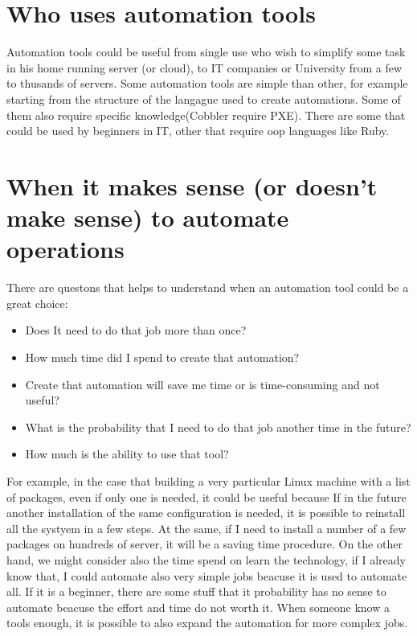 \documentclass[12pt,a4paper,openright,twoside]{book}
\begin{document}
\section{Who uses automation tools}
Automation tools could be useful from single use who wish to simplify some task in his home running server (or cloud), to IT companies or University from a few to thusands of servers.
Some automation tools are simple than other, for example starting from the structure of the langague used to create automations.
Some of them also require specific knowledge(Cobbler require PXE).
There are some that could be used by beginners in IT, other that require oop languages like Ruby.

\section{When it makes sense (or doesn't make sense) to automate operations}
There are questons that helps to understand when an automation tool could be a great choice:
\begin{itemize}
    \item Does It need to do that job more than once?
    \item How much time did I spend to create that automation?
    \item Create that automation will save me time or is time-consuming and not useful?
    \item What is the probability that I need to do that job another time in the future?
    \item How much is the ability to use that tool?
\end{itemize}

For example, in the case that building a very particular Linux machine with a list of packages, even if only one is needed, it could be useful because If in the future another installation of the same configuration is needed, it is possible to reinstall all the systyem in a few steps.
At the same, if I need to install a number of a few packages on hundreds of server, it will be a saving time procedure.
On the other hand, we might consider also the time spend on learn the technology, if I already know that, I could automate also very simple jobs beacuse it is used to automate all.
If it is a beginner, there are some stuff that it probability has no sense to automate beacuse the effort and time do not worth it.
When someone know a tools enough, it is possible to also expand the automation for more complex jobs.
\end{document}
